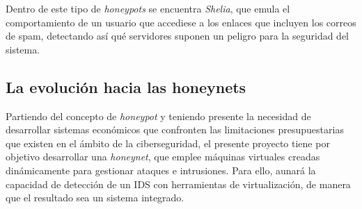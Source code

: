 Dentro de este tipo de \textit{honeypots} se encuentra \textit{Shelia}, que emula el comportamiento de un usuario que accediese a los enlaces que incluyen los correos de spam, detectando así qué servidores suponen un peligro para la seguridad del sistema\cite{shelia}.  

\subsection{La evolución hacia las honeynets}
Partiendo del concepto de \textit{honeypot} y teniendo presente la necesidad de desarrollar sistemas económicos que confronten las limitaciones presupuestarias que existen en el ámbito de la ciberseguridad, el presente proyecto tiene por objetivo desarrollar una \textit{honeynet}, que emplee máquinas virtuales creadas dinámicamente para gestionar ataques e intrusiones. Para ello, aunará la capacidad de detección de un IDS con herramientas de virtualización, de manera que el resultado sea un sistema integrado. 
